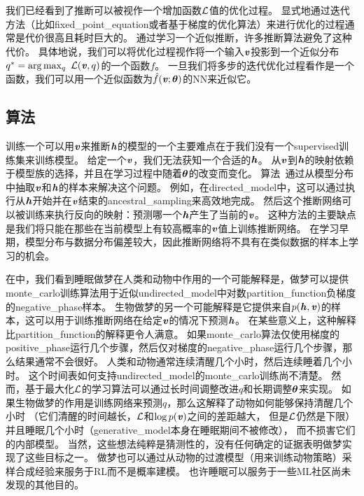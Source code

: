 \section{}
\label{sec:learned_approximate_inference}

我们已经看到了推断可以被视作一个增加函数$\mathcal{L}$值的优化过程。
显式地通过迭代方法（比如\gls{fixed_point_equation}或者基于梯度的优化算法）来进行优化的过程通常是代价很高且耗时巨大的。
通过学习一个近似推断，许多推断算法避免了这种代价。
具体地说，我们可以将优化过程视作将一个输入$\boldsymbol{\mathit{v}}$投影到一个近似分布$q^* = \arg\max_q\  \mathcal{L}(\boldsymbol{\mathit{v}},q)$的一个函数$f$。
一旦我们将多步的迭代优化过程看作是一个函数，我们可以用一个近似函数为$\hat{f}(\boldsymbol{\mathit{v}};{\boldsymbol{\theta}})$的\gls{NN}来近似它。


\subsection{算法}  %
\label{sec:wake_sleep}

训练一个可以用$\boldsymbol{\mathit{v}}$来推断$\boldsymbol{\mathit{h}}$的模型的一个主要难点在于我们没有一个\gls{supervised}训练集来训练模型。
给定一个$\boldsymbol{\mathit{v}}$，我们无法获知一个合适的$\boldsymbol{\mathit{h}}$。
从$\boldsymbol{\mathit{v}}$到$\boldsymbol{\mathit{h}}$的映射依赖于模型族的选择，并且在学习过程中随着${\boldsymbol{\theta}}$的改变而变化。
算法~\citep{Hinton95,Frey96}通过从模型分布中抽取$\boldsymbol{\mathit{v}}$和$\boldsymbol{\mathit{h}}$的样本来解决这个问题。
例如，在\gls{directed_model}中，这可以通过执行从$\boldsymbol{\mathit{h}}$开始并在$\boldsymbol{\mathit{v}}$结束的\gls{ancestral_sampling}来高效地完成。
然后这个推断网络可以被训练来执行反向的映射：预测哪一个$\boldsymbol{\mathit{h}}$产生了当前的$\boldsymbol{\mathit{v}}$。
这种方法的主要缺点是我们将只能在那些在当前模型上有较高概率的$\boldsymbol{\mathit{v}}$值上训练推断网络。
在学习早期，模型分布与数据分布偏差较大，因此推断网络将不具有在类似数据的样本上学习的机会。


在中，我们看到睡眠做梦在人类和动物中作用的一个可能解释是，做梦可以提供\gls{monte_carlo}训练算法用于近似\gls{undirected_model}中对数\gls{partition_function}负梯度的\gls{negative_phase}样本。
生物做梦的另一个可能解释是它提供来自$p(\boldsymbol{\mathit{h}},\boldsymbol{\mathit{v}})$的样本，这可以用于训练推断网络在给定$\boldsymbol{\mathit{v}}$的情况下预测$\boldsymbol{\mathit{h}}$。
在某些意义上，这种解释比\gls{partition_function}的解释更令人满意。
如果\gls{monte_carlo}算法仅使用梯度的\gls{positive_phase}运行几个步骤，然后仅对梯度的\gls{negative_phase}运行几个步骤，那么结果通常不会很好。
人类和动物通常连续清醒几个小时，然后连续睡着几个小时。
这个时间表如何支持\gls{undirected_model}的\gls{monte_carlo}训练尚不清楚。
然而，基于最大化$\mathcal{L}$的学习算法可以通过长时间调整改进$q$和长期调整${\boldsymbol{\theta}}$来实现。
如果生物做梦的作用是训练网络来预测$q$，那么这解释了动物如何能够保持清醒几个小时
（它们清醒的时间越长，$\mathcal{L}$和$\log p(\boldsymbol{\mathit{v}})$之间的差距越大， 但是$\mathcal{L}$仍然是下限）
并且睡眠几个小时（\gls{generative_model}本身在睡眠期间不被修改）， 而不损害它们的内部模型。
当然，这些想法纯粹是猜测性的，没有任何确定的证据表明做梦实现了这些目标之一。
做梦也可以通过从动物的过渡模型（用来训练动物策略）采样合成经验来服务于\gls{RL}而不是概率建模。
也许睡眠可以服务于一些\gls{ML}社区尚未发现的其他目的。



